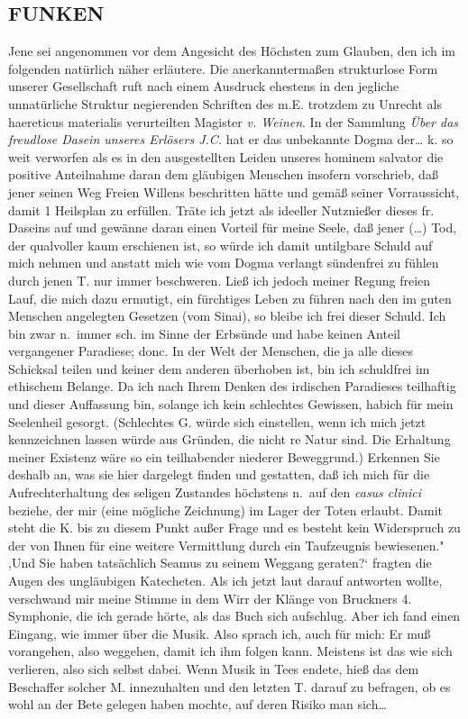 \documentclass[
]{article}
\author{}
\date{\vspace{-2.5em}}
\begin{document}
\subsection{FUNKEN}\label{funken}

Jene sei angenommen vor dem Angesicht des Höchsten zum Glauben, den ich
im folgenden natürlich näher erläutere. Die anerkanntermaßen
strukturlose Form unserer Gesellschaft ruft nach einem Ausdruck ehestens
in den jegliche unnatürliche Struktur negierenden Schriften des m.E.
trotzdem zu Unrecht als haereticus materialis verurteilten Magister
\emph{v. Weinen}. In der Sammlung \emph{Über das freudlose Dasein
unseres Erlösers J.C.} hat er das unbekannte Dogma der\ldots{} k. so
weit verworfen als es in den ausgestellten Leiden unseres hominem
salvator die positive Anteilnahme daran dem gläubigen Menschen insofern
vorschrieb, daß jener seinen Weg Freien Willens beschritten hätte und
gemäß seiner Vorraussicht, damit 1 Heilsplan zu erfüllen. Träte ich
jetzt als ideeller Nutznießer dieses fr. Daseins auf und gewänne daran
einen Vorteil für meine Seele, daß jener (\ldots) Tod, der qualvoller
kaum erschienen ist, so würde ich damit untilgbare Schuld auf mich
nehmen und anstatt mich wie vom Dogma verlangt sündenfrei zu fühlen
durch jenen T. nur immer beschweren. Ließ ich jedoch meiner Regung
freien Lauf, die mich dazu ermutigt, ein fürchtiges Leben zu führen nach
den im guten Menschen angelegten Gesetzen (vom Sinai), so bleibe ich
frei dieser Schuld. Ich bin zwar n.~immer sch. im Sinne der Erbsünde und
habe keinen Anteil vergangener Paradiese; donc. In der Welt der
Menschen, die ja alle dieses Schicksal teilen und keiner dem anderen
überhoben ist, bin ich schuldfrei im ethischem Belange. Da ich nach
Ihrem Denken des irdischen Paradieses teilhaftig und dieser Auffassung
bin, solange ich kein schlechtes Gewissen, habich für mein Seelenheil
gesorgt. (Schlechtes G. würde sich einstellen, wenn ich mich jetzt
kennzeichnen lassen würde aus Gründen, die nicht re Natur sind. Die
Erhaltung meiner Existenz wäre so ein teilhabender niederer Beweggrund.)
Erkennen Sie deshalb an, was sie hier dargelegt finden und gestatten,
daß ich mich für die Aufrechterhaltung des seligen Zustandes höchstens
n.~auf den \emph{casus clinici} beziehe, der mir (eine mögliche
Zeichnung) im Lager der Toten erlaubt. Damit steht die K. bis zu diesem
Punkt außer Frage und es besteht kein Widerspruch zu der von Ihnen für
eine weitere Vermittlung durch ein Taufzeugnis bewiesenen."\\
,Und Sie haben tatsächlich Seamus zu seinem Weggang geraten?{}` fragten
die Augen des ungläubigen Katecheten. Als ich jetzt laut darauf
antworten wollte, verschwand mir meine Stimme in dem Wirr der Klänge von
Bruckners 4. Symphonie, die ich gerade hörte, als das Buch sich
aufschlug. Aber ich fand einen Eingang, wie immer über die Musik. Also
sprach ich, auch für mich: Er muß vorangehen, also weggehen, damit ich
ihm folgen kann. Meistens ist das wie sich verlieren, also sich selbst
dabei. Wenn Musik in Tees endete, hieß das dem Beschaffer solcher M.
innezuhalten und den letzten T. darauf zu befragen, ob es wohl an der
Bete gelegen haben mochte, auf deren Risiko man sich\ldots{}
\end{document}
